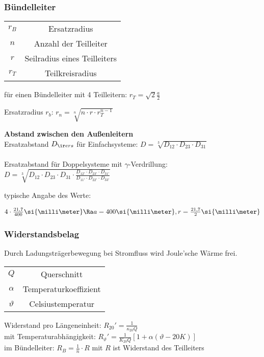 \documentclass[german]{latex4ei/latex4ei_sheet}
\begin{document}
\begin{sectionbox}
\subsubsection{Bündelleiter}

\begin{symbolbox}
	\begin{tabular}{cc}
	$r_B$ & Ersatzradius \\
	$n$ & Anzahl der Teilleiter \\
	$r$ & Seilradius eines Teilleiters \\
	$r_T$ & Teilkreisradius
	\end{tabular}
\end{symbolbox}
für einen Bündelleiter mit 4 Teilleitern: $r_T = \sqrt 2 \frac{a}{2}$

Ersatzradius $r_b$: $r_n = \sqrt[n]{n \cdot r \cdot r^{n-1}_{T}} $

\textbf{Abstand zwischen den Außenleitern} \\
Ersatzabstand $D_{\ir ers}$ für Einfachsysteme: $D = \sqrt[3]{D_{12} \cdot D_{23} \cdot D_{31}}$ \\ \\
Ersatzabstand für Doppelsysteme mit $\gamma$-Verdrillung: \\
$D =  \sqrt[3]{D_{12} \cdot D_{23} \cdot D_{31} \cdot \frac{D_{12'} \cdot D_{23'} \cdot D_{31'}}{D_{11'} \cdot D_{22'} \cdot D_{33'}}}$

typische Angabe des Werte:

$4 \cdot \frac{21,7}{400} \si{\milli \meter} \Ra a = 400 \si{\milli \meter}, r=\frac{21,7}{2} \si{\milli \meter} $
\end{sectionbox}

\begin{sectionbox}
\subsubsection{Widerstandsbelag}

Durch Ladungsträgerbewegung bei Stromfluss wird Joule'sche Wärme frei.

\begin{symbolbox}
	\begin{tabular}{cc}
	$Q$ & Querschnitt \\
	$\alpha$ & Temperaturkoeffizient \\
	$\vartheta$ & Celsiustemperatur
	\end{tabular}
\end{symbolbox}

Widerstand pro Längeneinheit: $R_{20}' =  \frac{1}{\kappa_{20} Q}$ \\
mit Temperaturabhängigkeit: $R_{\vartheta}'= \frac{1}{K_{20} Q} \left[ 1+ \alpha ( \vartheta - 20 K) \right]$\\

im Bündelleiter: $R_B = \frac{1}{n} \cdot R$ mit $R$ ist Widerstand des Teilleiters
\end{sectionbox}
\end{document}
